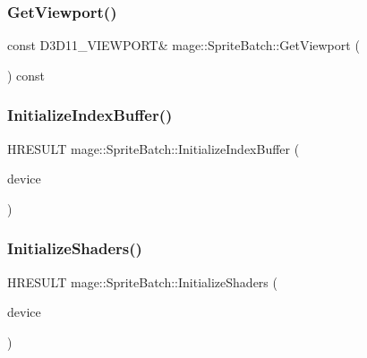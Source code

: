 \hypertarget{classmage_1_1_sprite_batch_a67bdd7fb00644aefb3c7ecfaa7923a39}{}\label{classmage_1_1_sprite_batch_a67bdd7fb00644aefb3c7ecfaa7923a39} 
\subsubsection{\texorpdfstring{Get\+Viewport()}{GetViewport()}}
{\footnotesize\ttfamily const D3\+D11\+\_\+\+V\+I\+E\+W\+P\+O\+RT\& mage\+::\+Sprite\+Batch\+::\+Get\+Viewport (\begin{DoxyParamCaption}{ }\end{DoxyParamCaption}) const}

\hypertarget{classmage_1_1_sprite_batch_ae9625c709af19d244d9b7739f64591ed}{}\label{classmage_1_1_sprite_batch_ae9625c709af19d244d9b7739f64591ed} 
\subsubsection{\texorpdfstring{Initialize\+Index\+Buffer()}{InitializeIndexBuffer()}}
{\footnotesize\ttfamily H\+R\+E\+S\+U\+LT mage\+::\+Sprite\+Batch\+::\+Initialize\+Index\+Buffer (\begin{DoxyParamCaption}\item[{I\+D3\+D11\+Device2 \&}]{device }\end{DoxyParamCaption})\hspace{0.3cm}{\ttfamily [private]}}

\hypertarget{classmage_1_1_sprite_batch_abceb0e16fb2bb82c9266d3f55befc69a}{}\label{classmage_1_1_sprite_batch_abceb0e16fb2bb82c9266d3f55befc69a} 
\subsubsection{\texorpdfstring{Initialize\+Shaders()}{InitializeShaders()}}
{\footnotesize\ttfamily H\+R\+E\+S\+U\+LT mage\+::\+Sprite\+Batch\+::\+Initialize\+Shaders (\begin{DoxyParamCaption}\item[{I\+D3\+D11\+Device2 \&}]{device }\end{DoxyParamCaption})\hspace{0.3cm}{\ttfamily [private]}}


